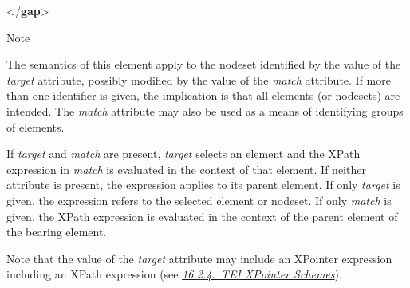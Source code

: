 \begin{reflist}
\begin{sansreflist}
\begin{reflist}
    \item[]\mbox{}\newline 
{}\mbox{}\newline 
{</\textbf{gap}>}
\end{reflist}  
\end{sansreflist}  
    \item[{Note}]
  \par
The semantics of this element apply to the nodeset identified by the value of the {\itshape target} attribute, possibly modified by the value of the {\itshape match} attribute. If more than one identifier is given, the implication is that all elements (or nodesets) are intended. The {\itshape match} attribute may also be used as a means of identifying groups of elements.\par
If {\itshape target} and {\itshape match} are present, {\itshape target} selects an element and the XPath expression in {\itshape match} is evaluated in the context of that element. If neither attribute is present, the expression applies to its parent element. If only {\itshape target} is given, the expression refers to the selected element or nodeset. If only {\itshape match} is given, the XPath expression is evaluated in the context of the parent element of the bearing element.\par
Note that the value of the {\itshape target} attribute may include an XPointer expression including an XPath expression (see \textit{\hyperref[SATS]{16.2.4.\ TEI XPointer Schemes}}).
\end{reflist}  
